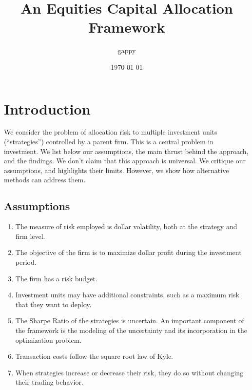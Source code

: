 \documentclass[11pt]{gappyarticle}
\title{An Equities Capital Allocation Framework}
\author{gappy}
\date{\today}
\begin{document}
 
\maketitle
\section{Introduction}
We consider the problem of allocation risk to multiple investment units (``strategies'') controlled by a parent firm. This is a central problem in investment. We list below our assumptions, the main thrust behind the approach, and the findings. We don't claim that this approach is universal. We critique our assumptions, and highlights their limits. However, we show how alternative methods can address them. 


\subsection{Assumptions}
\begin{enumerate}
	\item The measure of risk employed is dollar volatility, both at the strategy and firm level.
	\item The objective of the firm is to maximize dollar profit during the investment period.
	\item The firm has a risk budget.
	\item Investment units may have additional constraints, such as a maximum risk that they want to deploy.
    \item The Sharpe Ratio of the strategies is uncertain. An important component of the framework is the modeling of the uncertainty and its incorporation in the optimization problem.
    \item Transaction costs follow the square root law of Kyle. 
    \item When strategies increase or decrease their risk, they do so without changing their trading behavior.
\end{enumerate}
\end{document}
